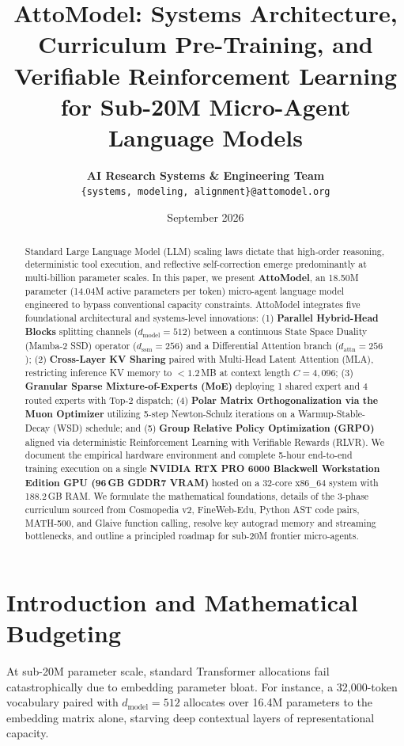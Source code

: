 \documentclass[10pt,twocolumn,letterpaper]{article}
\title{\textbf{AttoModel: Systems Architecture, Curriculum Pre-Training, and Verifiable Reinforcement Learning for Sub-20M Micro-Agent Language Models}}
\author{
    \textbf{AI Research Systems \& Engineering Team} \\
    \texttt{\{systems, modeling, alignment\}@attomodel.org}
}
\date{September 2026}
\begin{document}
\maketitle

\begin{abstract}
Standard Large Language Model (LLM) scaling laws dictate that high-order reasoning, deterministic tool execution, and reflective self-correction emerge predominantly at multi-billion parameter scales. In this paper, we present \textbf{AttoModel}, an 18.50M parameter (14.04M active parameters per token) micro-agent language model engineered to bypass conventional capacity constraints. AttoModel integrates five foundational architectural and systems-level innovations: (1) \textbf{Parallel Hybrid-Head Blocks} splitting channels ($d_{\text{model}} = 512$) between a continuous State Space Duality (Mamba-2 SSD) operator ($d_{\text{ssm}} = 256$) and a Differential Attention branch ($d_{\text{attn}} = 256$); (2) \textbf{Cross-Layer KV Sharing} paired with Multi-Head Latent Attention (MLA), restricting inference KV memory to $< 1.2$\,MB at context length $C = 4,096$; (3) \textbf{Granular Sparse Mixture-of-Experts (MoE)} deploying 1 shared expert and 4 routed experts with Top-2 dispatch; (4) \textbf{Polar Matrix Orthogonalization via the Muon Optimizer} utilizing 5-step Newton-Schulz iterations on a Warmup-Stable-Decay (WSD) schedule; and (5) \textbf{Group Relative Policy Optimization (GRPO)} aligned via deterministic Reinforcement Learning with Verifiable Rewards (RLVR). We document the empirical hardware environment and complete 5-hour end-to-end training execution on a single \textbf{NVIDIA RTX PRO 6000 Blackwell Workstation Edition GPU (96\,GB GDDR7 VRAM)} hosted on a 32-core x86\_64 system with 188.2\,GB RAM. We formulate the mathematical foundations, details of the 3-phase curriculum sourced from Cosmopedia v2, FineWeb-Edu, Python AST code pairs, MATH-500, and Glaive function calling, resolve key autograd memory and streaming bottlenecks, and outline a principled roadmap for sub-20M frontier micro-agents.
\end{abstract}

\section{Introduction and Mathematical Budgeting}

At sub-20M parameter scale, standard Transformer allocations fail catastrophically due to embedding parameter bloat. For instance, a 32,000-token vocabulary paired with $d_{\text{model}} = 512$ allocates over 16.4M parameters to the embedding matrix alone, starving deep contextual layers of representational capacity.
\end{document}
